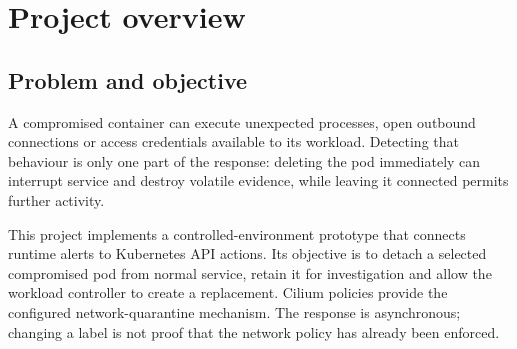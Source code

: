 \chapter{Project overview}
\label{ch:ch1}
\section{Problem and objective}
A compromised container can execute unexpected processes, open outbound connections
or access credentials available to its workload. Detecting that behaviour is only
one part of the response: deleting the pod immediately can interrupt service and
destroy volatile evidence, while leaving it connected permits further activity.

This project implements a controlled-environment prototype that connects runtime
alerts to Kubernetes API actions. Its objective is to detach a selected compromised
pod from normal service, retain it for investigation and allow the workload controller
to create a replacement. Cilium policies provide the configured network-quarantine
mechanism. The response is asynchronous; changing a label is not proof that the
network policy has already been enforced.

